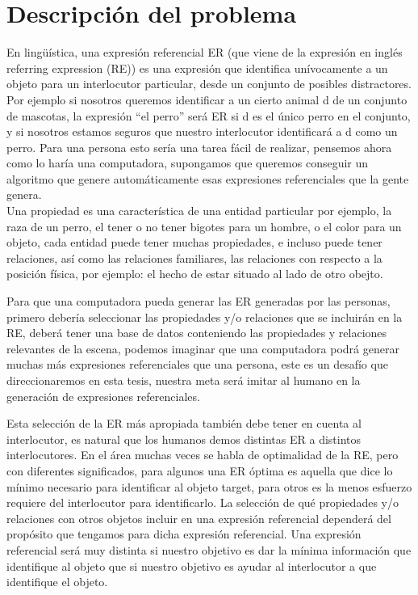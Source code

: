 \section{Descripci\'on del problema}
\label{sec:intro}

En ling\"u\'{i}stica, una expresi\'on referencial ER (que viene de la expresi\'on en ingl\'es referring expression (RE)) es una expresi\'on que identifica un\'ivocamente a un objeto para un interlocutor particular, desde un conjunto de posibles distractores. Por ejemplo si nosotros queremos identificar a un cierto animal d de un conjunto de mascotas, la expresi\'on ``el perro'' ser\'a ER si d es el \'unico perro en el conjunto, y si nosotros estamos seguros que nuestro interlocutor identificar\'a a d como un perro. Para una persona esto ser\'ia una tarea f\'acil de realizar, pensemos ahora como lo har\'ia una computadora, supongamos que queremos conseguir un algoritmo que genere autom\'aticamente esas expresiones referenciales que la gente genera.\\

Una propiedad es una caracter\'istica de una entidad particular por ejemplo, la raza de un perro, el tener o no tener bigotes para un hombre, o el color para un objeto, cada entidad puede tener muchas propiedades, e incluso puede tener relaciones, as\'i como las relaciones familiares, las relaciones con respecto a la posici\'on f\'isica, por ejemplo: el hecho de estar situado al lado de otro obejto.

 Para que una computadora pueda generar las ER generadas por las personas, primero deber\'ia seleccionar las propiedades y/o relaciones que se incluir\'an en la RE, deber\'a tener una base de datos conteniendo las propiedades y relaciones relevantes de la escena, podemos imaginar que una computadora podr\'a generar muchas m\'as expresiones referenciales que una persona, este es un desaf\'io que direccionaremos en esta tesis, nuestra meta ser\'a imitar al humano en la generaci\'on de expresiones referenciales. 

Esta selecci\'on de la ER m\'as apropiada tambi\'en debe tener en cuenta al interlocutor, es natural que los humanos demos distintas ER a distintos interlocutores. En el \'area muchas veces se habla de optimalidad de la RE, pero con diferentes significados, para algunos una ER \'optima es aquella que dice lo m\'inimo necesario para identificar al objeto target, para otros es la menos esfuerzo requiere del interlocutor para identificarlo.
La selecci\'on de qu\'e propiedades y/o relaciones con otros objetos incluir en una expresi\'on referencial depender\'a del prop\'osito que tengamos para dicha expresi\'on referencial. Una expresi\'on referencial ser\'a muy distinta si nuestro objetivo es dar la m\'inima informaci\'on que identifique al objeto que si nuestro objetivo es ayudar al interlocutor a que identifique el objeto.


